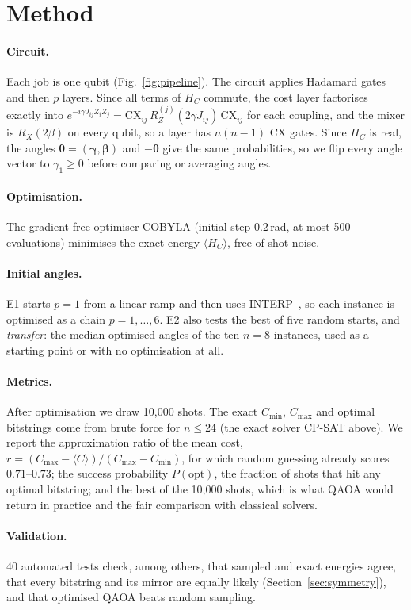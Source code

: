 
\section{Method}
\label{sec:method}

\paragraph{Circuit.}
Each job is one qubit (Fig.~\ref{fig:pipeline}).
The circuit applies Hadamard gates and then $p$ layers.
Since all terms of $H_C$ commute, the cost layer factorises exactly into
$e^{-i \gamma J_{ij} Z_i Z_j} = \mathrm{CX}_{ij}\, R_Z^{(j)}(2\gamma J_{ij})\, \mathrm{CX}_{ij}$ for each coupling,
and the mixer is $R_X(2\beta)$ on every qubit, so a layer has $n(n-1)$ CX gates.
Since $H_C$ is real, the angles $\boldsymbol\theta = (\boldsymbol\gamma, \boldsymbol\beta)$ and $-\boldsymbol\theta$ give the same probabilities, so we flip every angle vector to $\gamma_1 \geq 0$ before comparing or averaging angles.

\paragraph{Optimisation.}
The gradient-free optimiser COBYLA (initial step $0.2$\,rad, at most 500 evaluations) minimises the exact energy $\langle H_C \rangle$, free of shot noise.

\paragraph{Initial angles.}
E1 starts $p = 1$ from a linear ramp and then uses INTERP~\cite{zhou2020}, so each instance is optimised as a chain $p = 1, \dots, 6$.
E2 also tests the best of five random starts, and \emph{transfer}: the median optimised angles of the ten $n = 8$ instances, used as a starting point or with no optimisation at all.

\paragraph{Metrics.}
After optimisation we draw 10{,}000 shots.
The exact $C_{\min}$, $C_{\max}$ and optimal bitstrings come from brute force for $n \leq 24$ (the exact solver CP-SAT above).
We report the approximation ratio of the mean cost, $r = (C_{\max} - \langle C \rangle)/(C_{\max} - C_{\min})$, for which random guessing already scores $0.71$--$0.73$;
the success probability $P(\text{opt})$, the fraction of shots that hit any optimal bitstring;
and the best of the 10{,}000 shots, which is what QAOA would return in practice and the fair comparison with classical solvers.

\paragraph{Validation.}
40 automated tests check, among others, that sampled and exact energies agree, that every bitstring and its mirror are equally likely (Section~\ref{sec:symmetry}), and that optimised QAOA beats random sampling.
